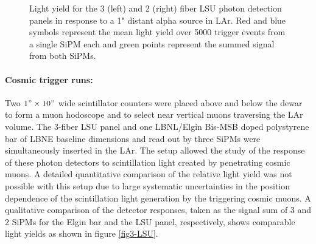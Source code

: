 \begin{figure}[htb]
  \begin{center}
\caption{Light yield for the 3 (left) and 2 (right) fiber LSU photon
  detection panels in response to a 1" distant alpha source in
  LAr. Red and blue symbols represent the mean light yield over 5000
  trigger events from a single SiPM each and green points represent
  the summed signal from both SiPMs.}
\label{fig2-LSU} 
\end{center}
\end{figure}
%
%
\paragraph{Cosmic trigger runs:} Two $ 1" \times 10"$ wide scintillator counters were placed above and below the dewar to form a muon hodoscope and to select near vertical muons traversing the LAr volume. The 3-fiber LSU panel and one LBNL/Elgin Bis-MSB doped polystyrene bar of LBNE baseline dimensions and read out by three SiPMs were simultaneously inserted in the LAr. The setup allowed the study of the response of these photon detectors to scintillation light created by penetrating cosmic muons. A detailed quantitative comparison of the relative light yield was not possible with this setup due to large systematic uncertainties in the position dependence of the scintillation light generation by the triggering cosmic muons. A qualitative comparison of the detector responses, taken as the signal sum of 3 and 2 SiPMs for the Elgin bar and the LSU panel, respectively, shows comparable light yields as shown in figure \ref{fig3-LSU}. 
        

